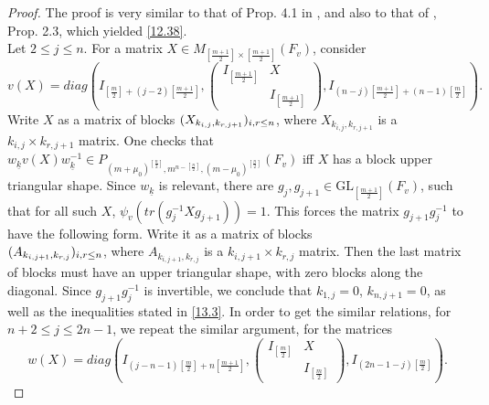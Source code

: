 \documentclass[12pts]{amsart}
\newcommand{\GL}{{\mathrm{GL}}}
\begin{document}
\begin{proof}
The proof is very similar to that of Prop. 4.1 in \cite{GJS15}, and also to that of \cite{GS18}, Prop. 2.3, which yielded \eqref{12.38}.\\
 Let $2\leq j\leq n$. For a matrix $X\in M_{[\frac{m+1}{2}]\times [\frac{m+1}{2}]}(F_v)$, consider
$$
v(X)=diag(I_{[\frac{m}{2}]+(j-2)[\frac{m+1}{2}]},\begin{pmatrix}I_{[\frac{m+1}{2}]}&X\\&I_{[\frac{m+1}{2}]}\end{pmatrix},I_{(n-j)[\frac{m+1}{2}]+(n-1)[\frac{m}{2}]}).
$$
Write $X$ as a matrix of blocks $(X_{k_{i,j},k_{r,j+1}})_{\scriptsize{i,r\leq n}}$, where $X_{k_{i,j},k_{r,j+1}}$ is a $k_{i,j}\times k_{r,j+1}$ matrix. One checks that $w_{\underline{k}}v(X)w_{\underline{k}}^{-1}\in P_{(m+\mu_0)^{[\frac{n}{2}]},m^{n-[\frac{n}{2}]}, (m-\mu_0)^{[\frac{n}{2}]}}(F_v)$ iff $X$ has a block upper triangular shape. Since $w_{\underline{k}}$ is relevant, there are $g_j,g_{j+1}\in \GL_{[\frac{m+1}{2}]}(F_v)$, such that for all such $X$, $\psi_v(tr(g^{-1}_jXg_{j+1}))=1$. This forces the matrix $g_{j+1}g_j^{-1}$ to have the following form. Write it as a matrix of blocks\\ $(A_{k_{i,j+1},k_{r,j}})_{\scriptsize{i,r\leq n}}$, where $A_{k_{i,j+1},k_{r,j}}$ is a $k_{i,j+1}\times k_{r,j}$ matrix. Then the last matrix of blocks must have an upper triangular shape, with zero blocks along the diagonal. Since $g_{j+1}g_j^{-1}$ is invertible, we conclude that $k_{1,j}=0$, $k_{n,j+1}=0$, as well as the inequalities stated in \eqref{13.3}. In order to get the similar relations, for $n+2\leq j\leq 2n-1$, we repeat the similar argument, for the matrices 
$$
w(X)=diag(I_{(j-n-1)[\frac{m}{2}]+n[\frac{m+1}{2}]},\begin{pmatrix}I_{[\frac{m}{2}]}&X\\&I_{[\frac{m}{2}]}\end{pmatrix},I_{(2n-1-j)[\frac{m}{2}]}).
$$
\end{proof}	
\end{document}
